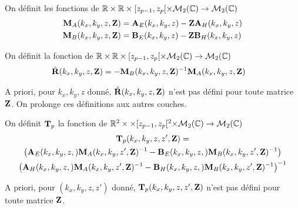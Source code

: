     \begin{defn}
      \label{def:plan:matrices_MA-MB}
      On définit les fonctions de \(\mathbb R\times\mathbb R\times [z_{p-1}, z_p[ \times \mathcal{M}_{2}(\mathbb C) \rightarrow \mathcal{M}_{2}(\mathbb C)\)
      \begin{align*}
        \mathbf{M}_{A}(k_x,k_y,z,\mathbf{Z}) &= \mathbf{A}_{E}(k_x,k_y,z)-\mathbf{Z}\mathbf{A}_{H}(k_x,k_y,z)
        \\
        \mathbf{M}_{B}(k_x,k_y,z,\mathbf{Z}) &= \mathbf{B}_{E}(k_x,k_y,z)-\mathbf{Z}\mathbf{B}_{H}(k_x,k_y,z)
      \end{align*}
    \end{defn}

    \begin{defn}
      \label{def:plan:reflexion:impedance}
      On définit la fonction de \(\mathbb R\times\mathbb R\times [z_{p-1}, z_p[ \times \mathcal{M}_{2}(\mathbb C) \rightarrow \mathcal{M}_{2}(\mathbb C)\)
      \begin{align*}
        \hat{\mathbf{R}}(k_x,k_y,z,\mathbf{Z}) &= -\mathbf{M}_{B}(k_x,k_y,z,\mathbf{Z})^{-1}\mathbf{M}_{A}(k_x,k_y,z,\mathbf{Z})
      \end{align*}
    \end{defn}
    A priori, pour \(k_x,k_y,z\) donné, \(\hat{\mathbf{R}}(k_x,k_y,z,\mathbf{Z})\) n'est pas défini pour toute matrice \(\mathbf{Z}\).
    On prolonge ces définitions aux autres couches.

    \begin{defn}%
      \label{def:plan:transfert:impedance}

      On définit \(\mathbf{T}_p\) la fonction de \(\mathbb R^2\times\times [z_{p-1}, z_p[^2\times\mathcal{M}_2(\mathbb C)\rightarrow \mathcal{M}_{2}(\mathbb C)\)
      \begin{multline*}
        \mathbf{T}_p(k_x,k_y,z,z',\mathbf{Z}) = \\
          \left(\mathbf{A}_{E}(k_x,k_y,z,)\mathbf{M}_{A}(k_x,k_y,z',\mathbf{Z})^{-1} - \mathbf{B}_{E}(k_x,k_y,z,)\mathbf{M}_{B}(k_x,k_y,z',\mathbf{Z})^{-1}\right) 
          \\
          \left(\mathbf{A}_{H}(k_x,k_y,z,)\mathbf{M}_{A}(k_x,k_y,z',\mathbf{Z})^{-1} - \mathbf{B}_{H}(k_x,k_y,z,)\mathbf{M}_{B}(k_x,k_y,z',\mathbf{Z})^{-1}\right)^{-1}
      \end{multline*}
    \end{defn}

    A priori, pour \((k_x,k_y,z,z')\) donné, \(\mathbf{T}_p(k_x,k_y,z,z',\mathbf{Z})\) n'est pas défini pour toute matrice \(\mathbf{Z}\).

